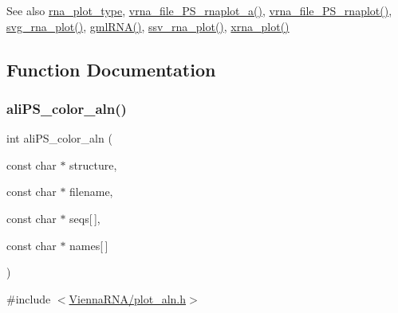 \begin{DoxySeeAlso}{See also}
\hyperlink{group__plotting__utils_ga5964c4581431b098b80027d6e14dcdd4}{rna\+\_\+plot\+\_\+type}, \hyperlink{plot__structure_8h_a139a31dd0ba9fc6612431f67de901c31}{vrna\+\_\+file\+\_\+\+P\+S\+\_\+rnaplot\+\_\+a()}, \hyperlink{plot__structure_8h_abdc8f6548ba4a3bc3cd868ccbcfdb86a}{vrna\+\_\+file\+\_\+\+P\+S\+\_\+rnaplot()}, \hyperlink{plot__structure_8h_ae7853539b5df98f294b4af434e979304}{svg\+\_\+rna\+\_\+plot()}, \hyperlink{plot__structure_8h_a70834bc8c0aad4fe6824ff76ccb8f329}{gml\+R\+N\+A()}, \hyperlink{plot__structure_8h_add368528755f9a830727b680243541df}{ssv\+\_\+rna\+\_\+plot()}, \hyperlink{plot__structure_8h_a2f6d5953e6a323df898896b8d6614483}{xrna\+\_\+plot()} 
\end{DoxySeeAlso}


\subsection{Function Documentation}
\mbox{\label{group__plotting__utils_gaab48d4dac655d688abe921389ac2847c}} 
\subsubsection{\texorpdfstring{ali\+P\+S\+\_\+color\+\_\+aln()}{aliPS\_color\_aln()}}
{\footnotesize\ttfamily int ali\+P\+S\+\_\+color\+\_\+aln (\begin{DoxyParamCaption}\item[{const char $\ast$}]{structure,  }\item[{const char $\ast$}]{filename,  }\item[{const char $\ast$}]{seqs\mbox{[}$\,$\mbox{]},  }\item[{const char $\ast$}]{names\mbox{[}$\,$\mbox{]} }\end{DoxyParamCaption})}



{\ttfamily \#include $<$\hyperlink{plot__aln_8h}{Vienna\+R\+N\+A/plot\+\_\+aln.\+h}$>$}

